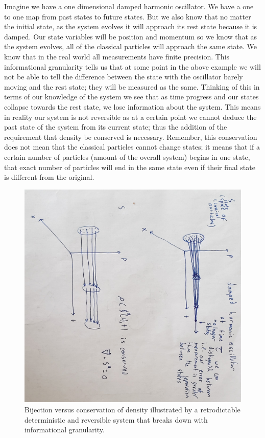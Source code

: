 \documentclass{article}
\begin{document}
	Imagine we have a one dimensional damped harmonic oscillator. We have a one to one map from past states to future states. But we also know that no matter the initial state, as the system evolves it will approach its rest state because it is damped. Our state variables will be position and momentum so we know that as the system evolves, all of the classical particles will approach the same state. We know that in the real world all measurements have finite precision. This informational granularity tells us that at some point in the above example we will not be able to tell the difference between the state with the oscillator barely moving and the rest state; they will be measured as the same. Thinking of this in terms of our knowledge of the system we see that as time progress and our states collapse towards the rest state, we lose information about the system. This means in reality our system is not reversible as at a certain point we cannot deduce the past state of the system from its current state; thus the addition of the requirement that density be conserved is necessary. Remember, this conservation does not mean that the classical particles cannot change states; it means that if a certain number of particles (amount of the overall system) begins in one state, that exact number of particles will end in the same state even if their final state is different from the original.
	
	
\begin{figure}[!ht]
\centerline{\includegraphics[width=\textwidth,angle=90,scale=.6]{streamfunctiondiagram.jpg}}
\caption{Bijection versus conservation of density illustrated by a retrodictable deterministic and reversible system that breaks down with informational granularity.}
\end{figure}
\end{document}
